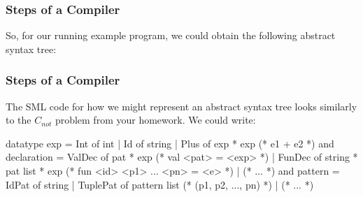 \documentclass[aspectratio=169]{beamer}
\begin{document}
\begin{frame}[fragile]
  \frametitle{Steps of a Compiler}

  So, for our running example program, we could obtain
  the following abstract syntax tree:
  \begin{center}
  \end{center}
\end{frame}

\begin{frame}[fragile]
  \frametitle{Steps of a Compiler}

  The SML code for how we might represent an abstract syntax tree looks
  similarly to the $C_{not}$ problem from your homework. We could write:

  \small
  \begin{codeblock}
    datatype exp =
        Int of int
      | Id of string
      | Plus of exp * exp               (* e1 + e2 *)
    and declaration =
        ValDec of pat * exp             (* val <pat> = <exp> *)
      | FunDec of string * pat list * exp
          (* fun <id> <p1> ... <pn> = <e> *)
      | (* ... *)
    and pattern =
        IdPat of string
      | TuplePat of pattern list        (* (p1, p2, ..., pn) *)
      | (* ... *)
  \end{codeblock}
\end{frame}
\end{document}
